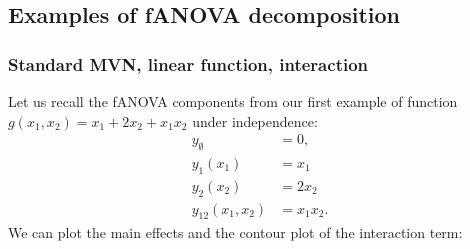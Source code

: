 \subsection{Examples of fANOVA decomposition}


\subsubsection*{Standard MVN, linear function, interaction}
Let us recall the fANOVA components from our first example of function $g(x_1, x_2) = x_1 + 2 x_2 + x_1 x_2$ under independence:
\begin{align*}
y_{\emptyset} &= 0, \\
y_1(x_1) &= x_1\\
y_2(x_2) &= 2x_2\\
y_{12}(x_1, x_2) &= x_1x_2.
\end{align*}
We can plot the main effects and the contour plot of the interaction term:
